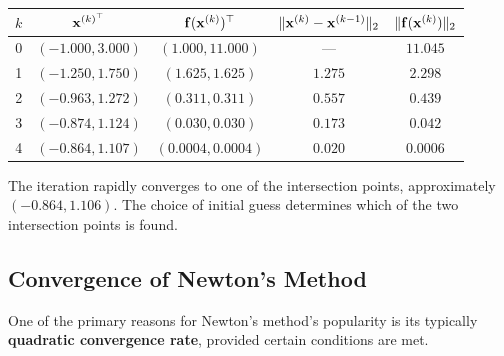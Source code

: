 \begin{exampleBox}
\begin{center}
\begin{tabular}{@{}ccccc@{}}
\toprule
$k$ & $\mathbf{x}^{(k)^\top}$ & $\mathbf{f}(\mathbf{x}^{(k)})^\top$ & $\|\mathbf{x}^{(k)}-\mathbf{x}^{(k-1)}\|_2$ & $\|\mathbf{f}(\mathbf{x}^{(k)})\|_2$ \\ \midrule
0 & $(-1.000, 3.000)$ & $(1.000, 11.000)$ & --- & $11.045$ \\
1 & $(-1.250, 1.750)$ & $(1.625, 1.625)$ & $1.275$ & $2.298$ \\
2 & $(-0.963, 1.272)$ & $(0.311, 0.311)$ & $0.557$ & $0.439$ \\
3 & $(-0.874, 1.124)$ & $(0.030, 0.030)$ & $0.173$ & $0.042$ \\
4 & $(-0.864, 1.107)$ & $(0.0004, 0.0004)$ & $0.020$ & $0.0006$ \\
\bottomrule
\end{tabular}
\end{center}

The iteration rapidly converges to one of the intersection points, approximately $(-0.864, 1.106)$. The choice of initial guess determines which of the two intersection points is found.

\end{exampleBox}

\subsection{Convergence of Newton's Method}
\label{sec:newtons_method_convergence}
One of the primary reasons for Newton's method's popularity is its typically \textbf{quadratic convergence rate}, provided certain conditions are met.

